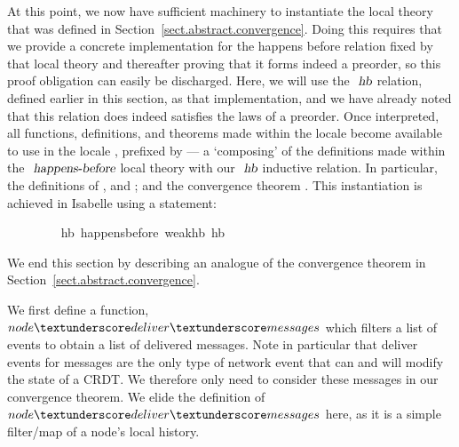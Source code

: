 \documentclass[acmlarge,review,anonymous]{acmart}\settopmatter{printfolios=true}
\begin{document}
At this point, we now have sufficient machinery to instantiate the  local theory that was defined in Section~\ref{sect.abstract.convergence}.
Doing this requires that we provide a concrete implementation for the happens before relation fixed by that local theory and thereafter proving that it forms indeed a preorder, so this proof obligation can easily be discharged.
Here, we will use the $\isa{hb}$ relation, defined earlier in this section, as that implementation, and we have already noted that this relation does indeed satisfies the laws of a preorder.
Once interpreted, all functions, definitions, and theorems made within the  locale become available to use in the locale , prefixed by --- a `composing' of the definitions made within the $\isa{happens-before}$ local theory with our $\isa{hb}$ inductive relation.
In particular, the definitions of ,  and ; and the convergence theorem .
This instantiation is achieved in Isabelle using a  statement:
\\
\begin{isabellebody}
\ \ \ \ \ \ \ \  hb{\isacharcolon}\ happens{\isacharunderscore}before\ weak{\isacharunderscore}hb\ hb
\end{isabellebody}
\vspace{\baselineskip}
\noindent
We end this section by describing an analogue of the convergence theorem in Section~\ref{sect.abstract.convergence}.

We first define a function, $node{\isacharunderscore}deliver{\isacharunderscore}messages$ which filters a list of events to obtain a list of delivered messages.
Note in particular that deliver events for messages are the only type of network event that can and will modify the state of a CRDT.
We therefore only need to consider these messages in our convergence theorem.
We elide the definition of $node{\isacharunderscore}deliver{\isacharunderscore}messages$ here, as it is a simple filter/map of a node's local history.
\end{document}
